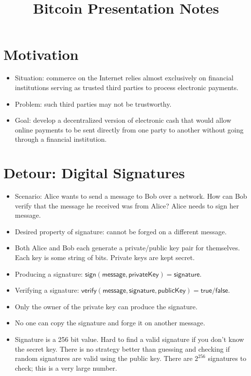 \documentclass{article}
\title{Bitcoin Presentation Notes}
\author{}
\date{}
\begin{document}
\maketitle

\section{Motivation}

\begin{itemize}
  \item Situation: commerce on the Internet relies almost exclusively on
    financial institutions serving as trusted third parties to process
    electronic payments.
  \item Problem: such third parties may not be trustworthy.
  \item Goal: develop a decentralized version of electronic cash that would
    allow online payments to be sent directly from one party to another without
    going through a financial institution.
\end{itemize}

\section{Detour: Digital Signatures}

\begin{itemize}
  \item Scenario: Alice wants to send a message to Bob over a network. How can
    Bob verify that the message he received was from Alice? Alice needs to sign
    her message.
  \item Desired property of signature: cannot be forged on a different message.
  \item Both Alice and Bob each generate a private/public key pair for
    themselves. Each key is some string of bits. Private keys are kept secret.
  \item Producing a signature: $\mathsf{sign(message, privateKey)} =
    \mathsf{signature}$.
  \item Verifying a signature: $\mathsf{verify(message, signature, publicKey) =
    true / false}$.
  \item Only the owner of the private key can produce the signature.
  \item No one can copy the signature and forge it on another message.
  \item Signature is a 256 bit value. Hard to find a valid signature if you
    don't know the secret key. There is no strategy better than guessing and
    checking if random signatures are valid using the public key. There are
    $2^{256}$ signatures to check; this is a very large number.
\end{itemize}
\end{document}
